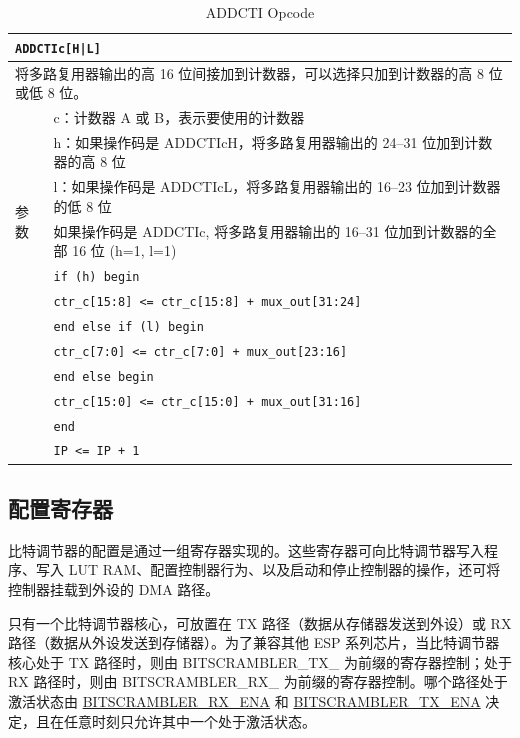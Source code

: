 \documentclass[main\_\_CN.tex]{subfiles}
\begin{document}
\begin{table}[H]
\caption{ADDCTI Opcode}
\label{tab:bitscrm-addcti-opcode}
\begin{tabular}{|l|p{15cm}|}
\hline
\multicolumn{2}{|l|}{\texttt{ADDCTIc[H|L]}} \\
\hline
\multicolumn{2}{|L{17cm}|}{将多路复用器输出的高 16 位间接加到计数器，可以选择只加到计数器的高 8 位或低 8 位。
} \\
\hline
\multirow{7}{*}{参数} & c：计数器 A 或 B，表示要使用的计数器 \\
& h：如果操作码是 ADDCTIcH，将多路复用器输出的 24–31 位加到计数器的高 8 位\\
& l：如果操作码是 ADDCTIcL，将多路复用器输出的 16–23 位加到计数器的低 8 位\\
& 如果操作码是 ADDCTIc, 将多路复用器输出的 16–31 位加到计数器的全部 16 位 (h=1, l=1) \\
\hline
\multirow{7}{*}{伪代码} & \texttt{if (h) begin} \\
& \hspace*{4mm} \texttt{ctr\_c[15:8] <= ctr\_c[15:8] + mux\_out[31:24]} \\
& \texttt{end else if (l) begin} \\
& \hspace*{4mm} \texttt{ctr\_c[7:0] <= ctr\_c[7:0] + mux\_out[23:16]} \\
& \texttt{end else begin} \\
& \hspace*{4mm} \texttt{ctr\_c[15:0] <= ctr\_c[15:0] + mux\_out[31:16]} \\
& \texttt{end} \\
& \texttt{IP <= IP + 1} \\
\hline
\end{tabular}
\end{table}

\subsection{配置寄存器}

比特调节器的配置是通过一组寄存器实现的。这些寄存器可向比特调节器写入程序、写入 LUT RAM、配置控制器行为、以及启动和停止控制器的操作，还可将控制器挂载到外设的 DMA 路径。

\chipname{} 只有一个比特调节器核心，可放置在 TX 路径（数据从存储器发送到外设）或 RX 路径（数据从外设发送到存储器）。为了兼容其他 ESP 系列芯片，当比特调节器核心处于 TX 路径时，则由 BITSCRAMBLER\_TX\_ 为前缀的寄存器控制；处于 RX 路径时，则由 BITSCRAMBLER\_RX\_ 为前缀的寄存器控制。哪个路径处于激活状态由 \hyperref[fielddesc:BITSCRAMBLERRXENA]{BITSCRAMBLER\_RX\_ENA} 和 \hyperref[fielddesc:BITSCRAMBLERTXENA]{BITSCRAMBLER\_TX\_ENA} 决定，且在任意时刻只允许其中一个处于激活状态。
\end{document}
